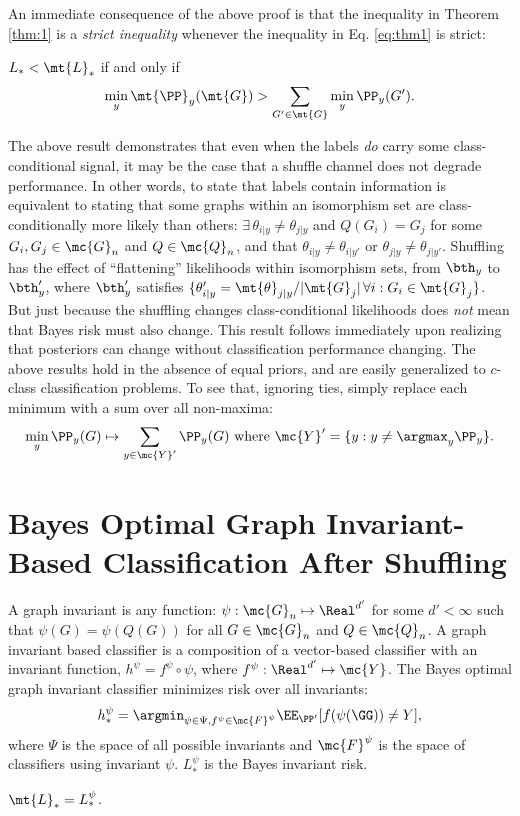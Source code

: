 \documentclass[10pt,journal,cspaper,compsoc]{IEEEtran}
\newcommand{\Qs}{Q}
\begin{document}
An immediate consequence of the above proof is that the inequality in Theorem \ref{thm:1} is a \emph{strict inequality} whenever the inequality in Eq. \ref{eq:thm1} is strict:

\begin{thm}
	$L_* < \mt{L}_*$ if and only if $$\min_y \mt{\PP}_{y}(\mt{G}) > \sum_{G' \in \mt{G}}\min_y\PP_y(G').$$
\end{thm}
The above result demonstrates that even when the labels \emph{do} carry some class-conditional signal, it may be the case that a shuffle channel does not degrade performance.  In other words, to state that labels contain information is equivalent to stating that some graphs within an isomorphism set are class-conditionally more likely than others: $\exists \, \theta_{i|y} \neq \theta_{j|y}$ and $\Qs(G_i)=G_j$ for some $G_i,G_j \in \mc{G}_n$ and $\Qs \in \mc{Q}_n$, and that $\theta_{i|y}\neq \theta_{i|y'}$ or $\theta_{j|y}\neq \theta_{j|y'}$.  Shuffling has the effect of ``flattening'' likelihoods within isomorphism sets, from $\bth_y$ to $\bth_y'$, where $\bth_y'$ satisfies $\{\theta_{i|y}'=\mt{\theta}_{j|y}/|\mt{G}_j| \, \forall i : G_i \in \mt{G}_j\}$.  But just because the shuffling changes class-conditional likelihoods does \emph{not} mean that Bayes risk must also change. This result follows immediately upon realizing that posteriors can change without classification performance changing.  The above results hold in the absence of equal priors, and are easily generalized to  $c$-class classification problems.  To see that, ignoring ties, simply replace each minimum with a sum over all non-maxima: $$\min_y \PP_y(G) \mapsto \sum_{y \in \mc{Y}'} \PP_y(G) \text{ where } \mc{Y}' =\{y : y \neq \argmax_y \PP_y\}.$$



\section{Bayes Optimal Graph Invariant-Based Classification After Shuffling} %
\label{sec:gi}

A graph invariant is any function: $\psi: \mc{G}_n \mapsto \Real^{d'}$  for some $d' < \infty$ such that $\psi(G)=\psi(\Qs(G))$ for all $G \in \mc{G}_n$ and $\Qs \in \mc{Q}_n$.  A graph invariant based classifier is a composition of a vector-based classifier with an invariant function, $h^\psi=f^\psi \circ \psi$, where $f^\psi: \Real^{d'} \mapsto \mc{Y}$.  The Bayes optimal graph invariant classifier minimizes risk over all invariants: 
\begin{align}
	h_*^{\psi}=\argmin_{\psi \in \Psi, f^{\psi} \in \mc{F}^{\psi}} \EE_{\PP'}[f(\psi(\GG))\neq Y],
\end{align}
where $\Psi$ is the space of all possible invariants and $\mc{F}^{\psi}$ is the space of classifiers using invariant $\psi$.   $L_*^{\psi}$ is the Bayes invariant risk.  
\begin{thm}
	$\mt{L}_*=L_*^\psi$.
\end{thm}
\end{document}

